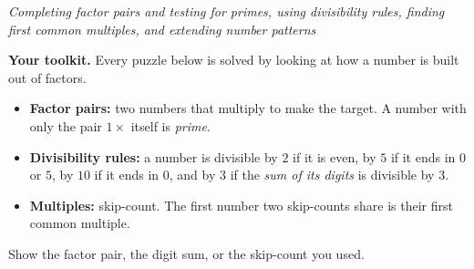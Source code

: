 \documentclass[12pt]{article}
\begin{document}

\begin{center}
\textit{Completing factor pairs and testing for primes, using divisibility
rules, finding first common multiples, and extending number patterns}
\end{center}

\noindent\textbf{Your toolkit.} Every puzzle below is solved by looking at how
a number is built out of factors.
\begin{itemize}[leftmargin=1.2cm, itemsep=2pt, topsep=2pt]
\item \textbf{Factor pairs:} two numbers that multiply to make the target. A
number with only the pair $1 \times$ itself is \emph{prime}.
\item \textbf{Divisibility rules:} a number is divisible by $2$ if it is even,
by $5$ if it ends in $0$ or $5$, by $10$ if it ends in $0$, and by $3$ if the
\emph{sum of its digits} is divisible by $3$.
\item \textbf{Multiples:} skip-count. The first number two skip-counts share is
their first common multiple.
\end{itemize}
Show the factor pair, the digit sum, or the skip-count you used.

\vspace{0.2cm}




\end{document}
